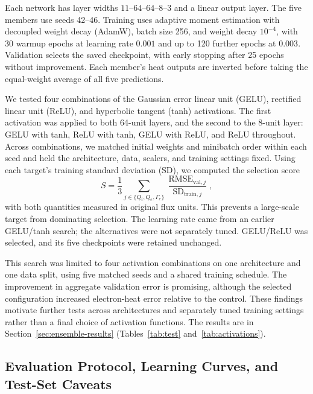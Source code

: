 \documentclass[12pt,letterpaper]{article}
\begin{document}
Each network has layer widths $11$--$64$--$64$--$8$--$3$ and a linear output
layer. The five members use seeds 42--46. Training uses adaptive moment estimation with decoupled weight decay
(AdamW), batch size 256,
and weight decay $10^{-4}$, with 30 warmup epochs at learning rate $0.001$
and up to 120 further epochs at $0.003$. Validation selects the saved checkpoint,
with early stopping after 25 epochs without improvement. Each member's heat
outputs are inverted before taking the equal-weight average of all five
predictions.

We tested four combinations of the Gaussian error linear unit (GELU),
rectified linear unit (ReLU), and hyperbolic tangent (tanh) activations. The first activation was applied to
both 64-unit layers, and the second to the 8-unit layer: GELU with tanh,
ReLU with tanh, GELU with ReLU, and ReLU throughout. Across combinations, we matched initial
weights and minibatch order within each seed and held the architecture, data,
scalers, and training settings fixed. Using each target's training standard
deviation (SD), we computed the selection score
\begin{equation}
  S = \frac{1}{3}\sum_{j\in\{Q_i,Q_e,\Gamma_e\}}
  \frac{\operatorname{RMSE}_{\mathrm{val},j}}
  {\operatorname{SD}_{\mathrm{train},j}},
  \label{eq:selection}
\end{equation}
with both quantities measured in original flux units. This prevents a
large-scale target from dominating selection. The learning rate came from
an earlier GELU/tanh search; the alternatives were not separately tuned.
GELU/ReLU was selected, and its five checkpoints were retained unchanged.

This search was limited to four activation combinations on one architecture
and one data split, using five matched seeds and a shared training schedule.
The improvement in aggregate validation error is promising, although the
selected configuration increased electron-heat error relative to the control.
These findings motivate further tests across architectures and separately
tuned training settings rather than a final choice of activation functions.
The results are in Section~\ref{sec:ensemble-results} (Tables~\ref{tab:test}
and~\ref{tab:activations}).

\subsection{Evaluation Protocol, Learning Curves, and Test-Set Caveats}
\label{sec:eval-methods}
\end{document}
